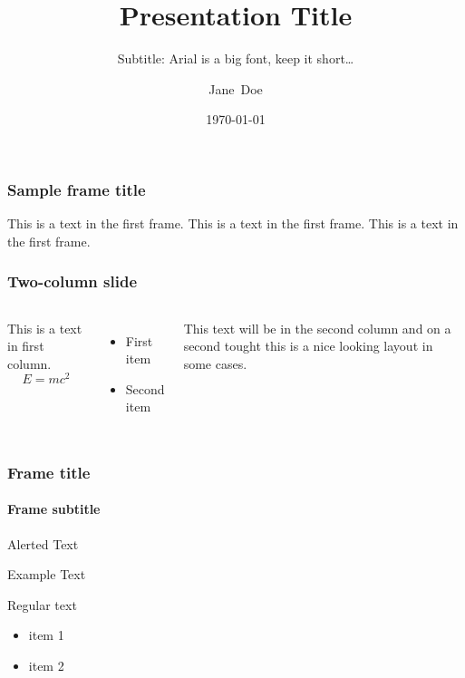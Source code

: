 \documentclass[xetex,aspectratio=169,12pt]{beamer}
\title{Presentation Title}
\subtitle{Subtitle: Arial is a big font, keep it short\ldots}
\date{\today}
\author{
	\insertspeaker\inst{1} \and Jane~Doe\inst{2}
}
\institute
{
	\inst{1}\insertspeakerinstitution\\
	The University of Queensland
	\and
	\inst{2}Faculty of Something Else\\
	The University of Queensland
}
\begin{document}
	\frame{\titlepage}

	\frame{\titlepage[1]}
	\frame{\titlepage[2]}
	\frame{\titlepage[3]}
	\frame{\titlepage[4]}


	\begin{frame}
		\frametitle{Sample frame title}
		This is a text in the first frame.
		This is a text in the first frame.
		This is a text in the first frame.
	\end{frame}


	\begin{frame}
		\frametitle{Two-column slide}
		\begin{columns}
				This is a text in first column.
				$$E=mc^2$$
				\begin{itemize}
					\item First item
					\item Second item
				\end{itemize}

				This text will be in the second column
				and on a second tought this is a nice looking
				layout in some cases.
		\end{columns}
	\end{frame}

	\begin{frame}
		\frametitle{Frame title}
		\framesubtitle{Frame subtitle}

		\alert{Alerted Text}
		\begin{Example}
			Example Text
		\end{Example}

		Regular text
		\begin{itemize}
			\item item 1
			\item item 2
		\end{itemize}
	\end{frame}

	\frame{\thankyou}
\end{document}
